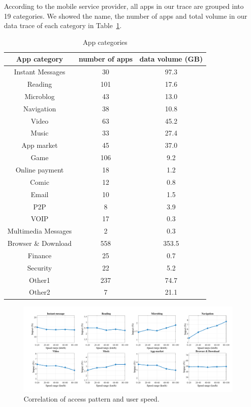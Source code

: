 According to the mobile service provider, all apps in our trace are grouped into 19 categories. We showed the name, the number of apps and total volume in our data trace of each category in Table~\ref{table:appcat}.  

\begin{table}
	\centering
	\begin{tabular}{ccc}\hline
	App category & number of apps & data volume (GB) \\ \hline
	Instant Messages & 30 & 97.3\\
	Reading & 101 & 17.6\\
	Microblog & 43 & 13.0\\
	Navigation & 38 & 10.8\\
	Video & 63 & 45.2\\
	Music & 33 & 27.4\\
	App market & 45 & 37.0\\
	Game & 106 & 9.2\\
	Online payment & 18 & 1.2\\
	Comic & 12 & 0.8\\
	Email & 10 & 1.5\\
	P2P & 8 & 3.9\\
	VOIP & 17 & 0.3\\
	Multimedia Messages & 2 & 0.3\\
	Browser \& Download & 558 & 353.5\\
	Finance & 25 & 0.7\\
	Security & 22 & 5.2\\
	Other1 & 237 & 74.7\\
	Other2 & 7 & 21.1\\ \hline
	\end{tabular}
	\caption{App categories}
	\label{table:appcat}
\end{table}

\begin{figure}[ht]
    \centering
    \includegraphics[width=\linewidth]{./figures/speed_appcat.pdf}
    \caption{Correlation of access pattern and user speed.}
    \label{fig:speed_appcat}
\end{figure}

